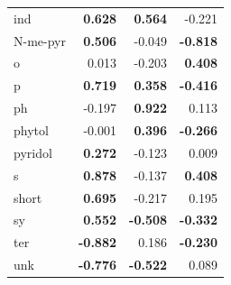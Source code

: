 \documentclass[10pt]{article}
\begin{document}
\begin{flushleft}
\begin{table}[h!]
{\begin{tabular}{lrrr}
  ind   & \textbf{ 0.628 } & \textbf{ 0.564 } & -0.221 \\ 
  N-me-pyr   & \textbf{ 0.506 } & -0.049 & \textbf{ -0.818 } \\ 
  o   & 0.013 & -0.203 & \textbf{ 0.408 } \\ 
  p   & \textbf{ 0.719 } & \textbf{ 0.358 } & \textbf{ -0.416 } \\ 
  ph   & -0.197 & \textbf{ 0.922 } & 0.113 \\ 
  phytol   & -0.001 & \textbf{ 0.396 } & \textbf{ -0.266 } \\ 
  pyridol   & \textbf{ 0.272 } & -0.123 & 0.009 \\ 
  s   & \textbf{ 0.878 } & -0.137 & \textbf{ 0.408 } \\ 
  short   & \textbf{ 0.695 } & -0.217 & 0.195 \\ 
  sy   & \textbf{ 0.552 } & \textbf{ -0.508 } & \textbf{ -0.332 } \\ 
  ter   & \textbf{ -0.882 } & 0.186 & \textbf{ -0.230 } \\ 
  unk   & \textbf{ -0.776 } & \textbf{ -0.522 } & 0.089 \\ 
   \hline
\end{tabular}
}
\end{table}


\begin{landscape}


\end{landscape}
\end{flushleft}
\end{document}
